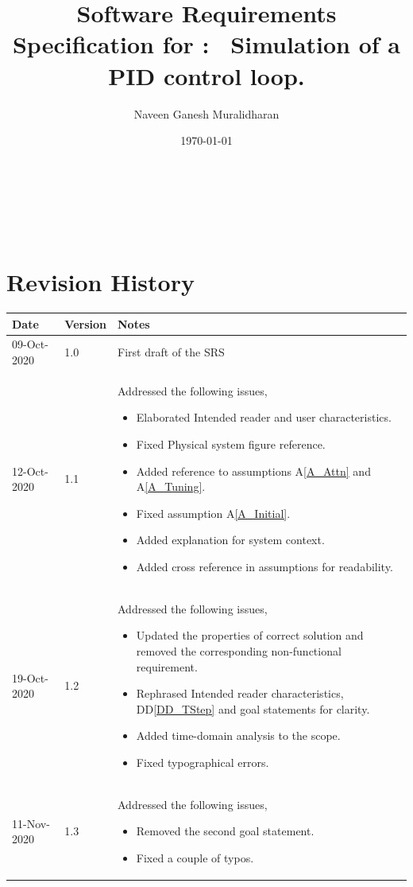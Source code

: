\documentclass[12pt]{article}
\newcommand{\ddref}[1]{DD\ref{#1}}
\newcommand{\aref}[1]{A\ref{#1}}
\begin{document}
\title{Software Requirements Specification for \progname: \
Simulation of a PID control loop.} 
\author{Naveen Ganesh Muralidharan}
\date{\today}
	
\maketitle

~\newpage


\tableofcontents

~\newpage

\section*{Revision History}

\begin{tabularx}{\textwidth}{p{3cm}p{2cm}X}
\toprule {\bf Date} & {\bf Version} & {\bf Notes}\\
\midrule
09-Oct-2020 & 1.0 & First draft of the SRS\\
12-Oct-2020 & 1.1 & Addressed the following issues,
\begin{itemize}
\item Elaborated Intended reader and user characteristics.
\item Fixed Physical system figure reference.
\item Added reference to assumptions \aref{A_Attn} and \aref{A_Tuning}.
\item Fixed assumption \aref{A_Initial}.
\item Added explanation for system context.
\item Added cross reference in assumptions for readability.
\end{itemize}\\
19-Oct-2020 & 1.2 & Addressed the following issues,
\begin{itemize}
\item Updated the properties of correct solution and removed the corresponding
non-functional requirement.
\item Rephrased Intended reader characteristics, \ddref{DD_TStep} and goal statements for
clarity.
\item Added time-domain analysis to the scope.
\item Fixed typographical errors.
\end{itemize}\\
11-Nov-2020 & 1.3 & Addressed the following issues,
\begin{itemize}
\item Removed the second goal statement.
\item Fixed a couple of typos.
\end{itemize}\\
\bottomrule
\end{tabularx}
\end{document}
